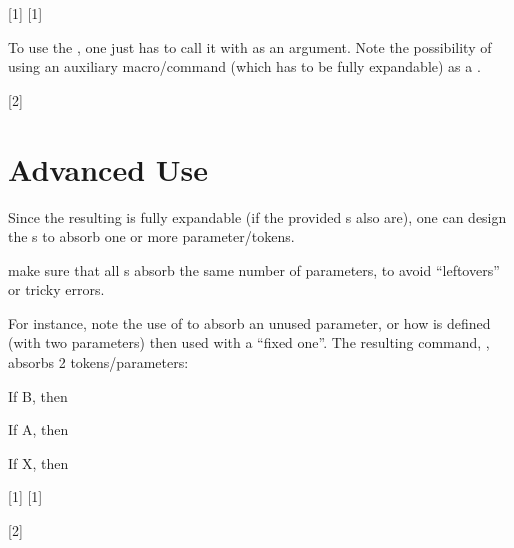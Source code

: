 \documentclass[10pt]{article}
\begin{document}
[1]
[1]

To use the , one just has to call it with  as an argument. Note the possibility of using an auxiliary macro/command (which has to be fully expandable) as a .


[2]

\section{Advanced Use}
Since the resulting  is fully expandable (if the provided s also are), one can design the s to absorb one or more parameter/tokens.

\begin{tsremark}
  make sure that all s absorb the same number of parameters, to avoid ``leftovers'' or tricky errors.
\end{tsremark}

For instance, note the use of \tsobj{\@gobble} to absorb an unused parameter, or how \tsobj{\cmdY} is defined (with two parameters) then used with a ``fixed one''. The resulting command, \tsobj{\TCase}, absorbs 2 tokens/parameters:


\begin{codestore}[switch03]
If B, then \par
If A, then \par
If X, then \par
\end{codestore}

[1]
[1]



[2]
\end{document}
